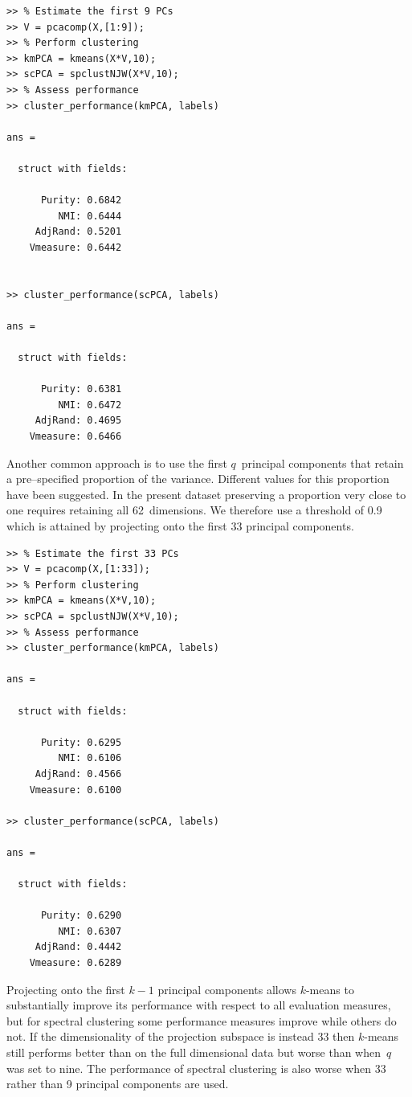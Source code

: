 \documentclass{book}
\begin{document}
\begin{verbatim}
>> % Estimate the first 9 PCs
>> V = pcacomp(X,[1:9]);
>> % Perform clustering
>> kmPCA = kmeans(X*V,10);
>> scPCA = spclustNJW(X*V,10);
>> % Assess performance
>> cluster_performance(kmPCA, labels)

ans = 

  struct with fields:

      Purity: 0.6842
         NMI: 0.6444
     AdjRand: 0.5201
    Vmeasure: 0.6442


>> cluster_performance(scPCA, labels)

ans = 

  struct with fields:

      Purity: 0.6381
         NMI: 0.6472
     AdjRand: 0.4695
    Vmeasure: 0.6466

\end{verbatim}

\noindent
%
Another common approach is to use the first $q$~principal components that
retain a pre--specified proportion of the variance. Different values for this
proportion have been suggested. In the present dataset preserving a proportion
very close to one requires retaining all 62~dimensions.  We therefore use a
threshold of 0.9 which is attained by projecting onto the first 33 principal
components.

\begin{verbatim}
>> % Estimate the first 33 PCs
>> V = pcacomp(X,[1:33]);
>> % Perform clustering
>> kmPCA = kmeans(X*V,10);
>> scPCA = spclustNJW(X*V,10);
>> % Assess performance
>> cluster_performance(kmPCA, labels)

ans = 

  struct with fields:

      Purity: 0.6295
         NMI: 0.6106
     AdjRand: 0.4566
    Vmeasure: 0.6100

>> cluster_performance(scPCA, labels)

ans = 

  struct with fields:

      Purity: 0.6290
         NMI: 0.6307
     AdjRand: 0.4442
    Vmeasure: 0.6289

\end{verbatim}


\noindent
%
Projecting onto the first $k-1$ principal components allows $k$-means to
substantially improve its performance with respect to all evaluation
measures, but for spectral clustering some performance measures improve
while others do not. If the
dimensionality of the projection subspace is instead 33 then $k$-means
still performs better than on the full dimensional data but worse than
when~$q$ was set to nine. The performance of spectral clustering is also
worse when 33 rather than 9 principal components are used.
\end{document}
